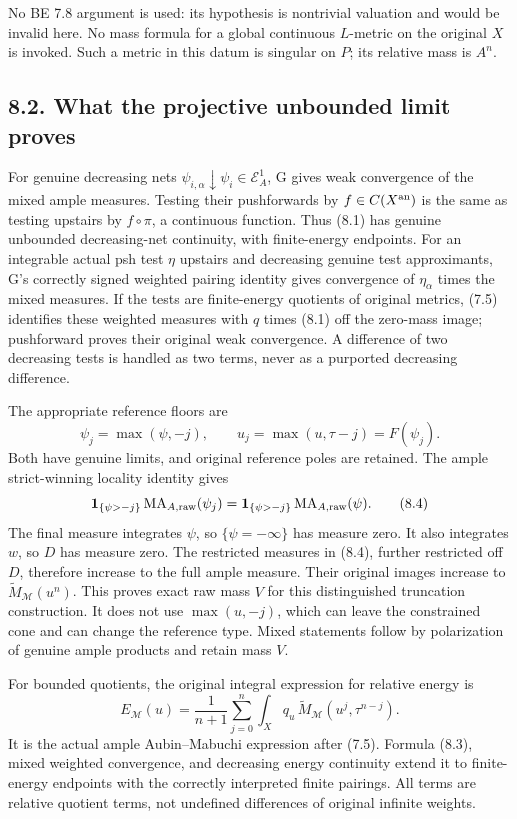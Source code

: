 \documentclass[
  10pt,
]{article}
\begin{document}
No BE 7.8 argument is used: its hypothesis is nontrivial valuation and
would be invalid here. No mass formula for a global continuous
\(L\)-metric on the original \(X\) is invoked. Such a metric in this
datum is singular on \(P\); its relative mass is \(A^n\).

\subsection{8.2. What the projective unbounded limit
proves}\label{what-the-projective-unbounded-limit-proves}

For genuine decreasing nets
\(\psi_{i,\alpha}\downarrow\psi_i\in\mathcal E^1_A\), G gives weak
convergence of the mixed ample measures. Testing their pushforwards by
\(f\in C(X^{\rm an})\) is the same as testing upstairs by \(f\circ\pi\),
a continuous function. Thus (8.1) has genuine unbounded decreasing-net
continuity, with finite-energy endpoints. For an integrable actual psh
test \(\eta\) upstairs and decreasing genuine test approximants, G's
correctly signed weighted pairing identity gives convergence of
\(\eta_\alpha\) times the mixed measures. If the tests are finite-energy
quotients of original metrics, (7.5) identifies these weighted measures
with \(q\) times (8.1) off the zero-mass image; pushforward proves their
original weak convergence. A difference of two decreasing tests is
handled as two terms, never as a purported decreasing difference.

The appropriate reference floors are \[
 \psi_j=\max(\psi,-j),\qquad u_j=\max(u,\tau-j)=F(\psi_j).
 \tag{8.3}
\] Both have genuine limits, and original reference poles are retained.
The ample strict-winning locality identity gives \[
 \mathbf1_{\{\psi>-j\}}\operatorname{MA}_{A,\rm raw}(\psi_j)
    =\mathbf1_{\{\psi>-j\}}\operatorname{MA}_{A,\rm raw}(\psi).
 \tag{8.4}
\] The final measure integrates \(\psi\), so \(\{\psi=-\infty\}\) has
measure zero. It also integrates \(w\), so \(D\) has measure zero. The
restricted measures in (8.4), further restricted off \(D\), therefore
increase to the full ample measure. Their original images increase to
\(\widetilde M_{\mathcal M}(u^n)\). This proves exact raw mass \(V\) for
this distinguished truncation construction. It does not use
\(\max(u,-j)\), which can leave the constrained cone and can change the
reference type. Mixed statements follow by polarization of genuine ample
products and retain mass \(V\).

For bounded quotients, the original integral expression for relative
energy is \[
 E_{\mathcal M}(u)=\frac1{n+1}\sum_{j=0}^n
       \int_X q_u\,\widetilde M_{\mathcal M}(u^j,\tau^{n-j}).
 \tag{8.5}
\] It is the actual ample Aubin--Mabuchi expression after (7.5). Formula
(8.3), mixed weighted convergence, and decreasing energy continuity
extend it to finite-energy endpoints with the correctly interpreted
finite pairings. All terms are relative quotient terms, not undefined
differences of original infinite weights.
\end{document}
